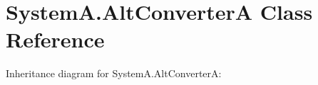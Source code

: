 \hypertarget{class_system_a_1_1_alt_converter_a}{}\section{System\+A.\+Alt\+Converter\+A Class Reference}
\label{class_system_a_1_1_alt_converter_a}


Inheritance diagram for System\+A.\+Alt\+Converter\+A\+:
